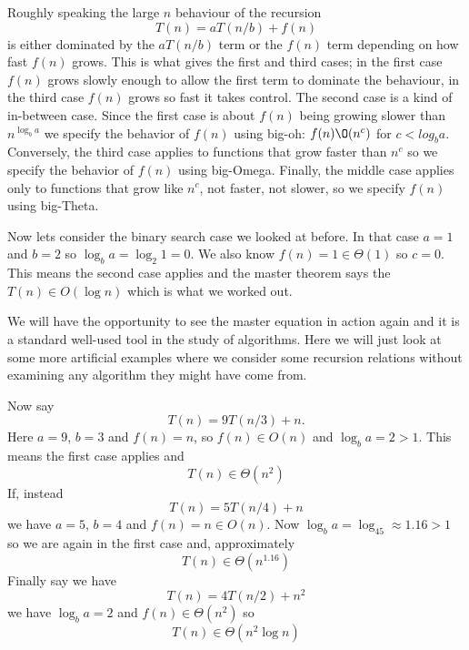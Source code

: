 \documentclass[11pt,a4paper]{scrartcl}
\begin{document}
Roughly speaking the large $n$ behaviour of the recursion
\begin{equation}
T(n)=aT(n/b)+f(n)
\end{equation}
is either dominated by the $aT(n/b)$ term or the $f(n)$ term depending
on how fast $f(n)$ grows. This is what gives the first and third
cases; in the first case $f(n)$ grows slowly enough to allow the first
term to dominate the behaviour, in the third case $f(n)$ grows so fast
it takes control. The second case is a kind of in-between case. Since
the first case is about $f(n)$ being growing slower than $n^{\log_ba}$
we specify the behavior of $f(n)$ using big-oh: $f(n)\O(n^c)$ for
$c<log_ba$. Conversely, the third case applies to functions that grow
faster than $n^c$ so we specify the behavior of $f(n)$ using
big-Omega. Finally, the middle case applies only to functions that
grow like $n^c$, not faster, not slower, so we specify $f(n)$ using big-Theta.

Now lets consider the binary search case we looked at before. In that case
$a=1$ and $b=2$ so $\log_ba=\log_2 1=0$. We also know $f(n)=1\in \Theta(1)$
so $c=0$. This means the second case applies and the master theorem
says the $T(n)\in O(\log n)$ which is what we worked out.

We will have the opportunity to see the master equation in action
again and it is a standard well-used tool in the study of
algorithms. Here we will just look at some more artificial examples
where we consider some recursion relations without examining any
algorithm they might have come from. 

Now say
\begin{equation}
T(n)=9T(n/3)+n.
\end{equation}
Here $a=9$, $b=3$ and $f(n)=n$, so $f(n)\in O(n)$ and $\log_ba=2>1$. This means the first case applies and
\begin{equation}
T(n)\in \Theta(n^2)
\end{equation}
If, instead
\begin{equation}
T(n)=5T(n/4)+n
\end{equation}
we have $a=5$, $b=4$ and $f(n)=n\in O(n)$. Now $\log_ba=\log_45\approx 1.16>1$ so we are again in the first case and, approximately 
\begin{equation}
T(n)\in \Theta(n^{1.16})
\end{equation}
Finally say we have
\begin{equation}
T(n)=4T(n/2)+n^2
\end{equation}
we have $\log_ba=2$ and $f(n)\in \Theta(n^2)$ so
\begin{equation}
T(n)\in \Theta(n^2\log n)
\end{equation}
\end{document}
